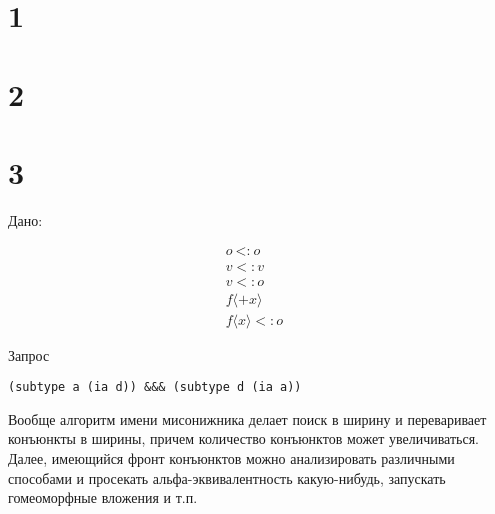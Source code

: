 \documentclass[a5paper,12pt]{article}
\newcommand{\subtypeof}[2]{ #1\ \text{<:}\ #2}
\begin{document}
\section{1}

\section{2}

\section{3}
Дано:

\begin{align*}
  \subtypeof{o}{o}&\\
  v <: v&\\
    v <: o& \\
    f\langle+x\rangle& \\
        f\langle x\rangle <: o& 
\end{align*}

Запрос
\begin{verbatim}
(subtype a (ia d)) &&& (subtype d (ia a))
\end{verbatim}

Вообще алгоритм имени мисонижника делает поиск в ширину и переваривает конъюнкты в ширины, причем количество конъюнктов может увеличиваться. Далее, имеющийся фронт конъюнктов можно анализировать различными способами и просекать альфа-эквивалентность какую-нибудь, запускать гомеоморфные вложения и т.п.
\end{document}
